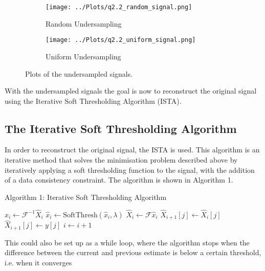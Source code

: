 \documentclass[12pt]{report} %
\begin{document}
\begin{figure}[htbp]
    \centering
    \begin{subfigure}[b]{0.45\textwidth}
        \texttt{[image: ../Plots/q2.2\_random\_signal.png]}
        \caption{Random Undersampling}
    \end{subfigure}
    \hfill
    \begin{subfigure}[b]{0.45\textwidth}
        \texttt{[image: ../Plots/q2.2\_uniform\_signal.png]}
        \caption{Uniform Undersampling}
    \end{subfigure}
    \caption{Plots of the undersampled signals.}
    \label{fig:undersampled_signals}
\end{figure}

With the undersampled signals the goal is now to reconstruct the original signal using the Iterative Soft Thresholding Algorithm (ISTA).


\subsection{The Iterative Soft Thresholding Algorithm}

In order to reconstruct the original signal, the ISTA is used. This algorithm is an iterative method that solves the minimisation problem described above by iteratively applying a soft thresholding function to the signal, with the addition of a data consistency constraint. The algorithm is shown in Algorithm 1.

\begin{definitionbox}{Algorithm 1: Iterative Soft Thresholding Algorithm}
    \begin{algorithmic}[1]
         
            \State $\hat{x}_{i} \gets \mathcal{F}^{-1}\hat{X}_{i}$ 
            \State $\hat{x}_{i} \gets \text{SoftThresh}(\hat{x}_{i}, \lambda)$ 
            \State $\hat{X}_{i} \gets \mathcal{F}\hat{x}_{i}$ 
             
                \State $\hat{X}_{i+1}[j] \gets \hat{X}_{i}[j]$
            \Else
                \State $\hat{X}_{i+1}[j] \gets y[j]$
            \EndIf
            \State $i \gets i + 1$
        \EndFor
        \end{algorithmic}
    This could also be set up as a while loop, where the algorithm stops when the difference between the current and previous estimate is below a certain threshold, i.e. when it converges
\end{definitionbox}
\end{document}
